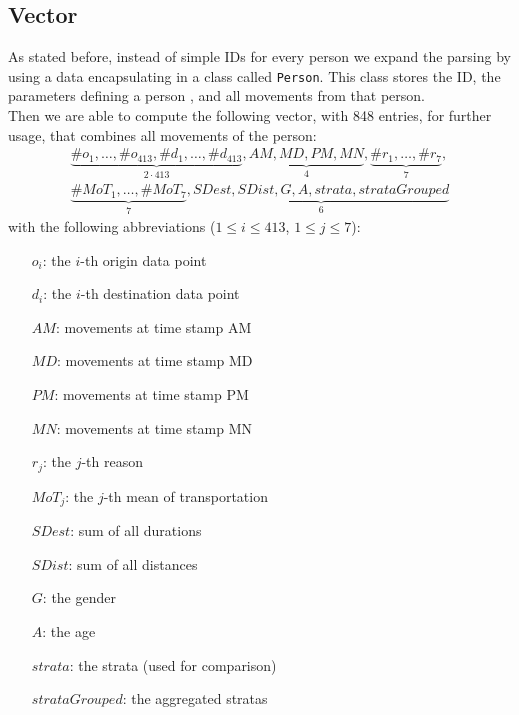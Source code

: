 \documentclass[runningheads]{llncs}
\begin{document}
	\subsection{Vector}\label{subsec: person vector data}
	As stated before, instead of simple IDs for every person we expand the parsing by using a data encapsulating in a class called \texttt{Person}. This class stores the ID, the parameters defining a person %
	, and all movements from that person.\\
	Then we are able to compute the following vector, with 848 entries, for further usage, that combines all movements of the person:
	\begin{align*}
	\underbrace{\#o_1, \dots, \#o_{413}, \#d_1, \dots, \#d_{413}}_{2\cdot 413} ,
	\underbrace{\mathit{AM}, \mathit{MD}, \mathit{PM}, \mathit{MN}}_{4}, 
	\underbrace{\#r_1, \dots, \#r_7}_{7}, \\
	\underbrace{\#\mathit{MoT}_1, \dots, \#\mathit{MoT}_7}_{7}, \underbrace{\mathit{SDest}, \mathit{SDist}, \mathit{G}, \mathit{A} ,\mathit{strata}, \mathit{strataGrouped}}_{6}
	\end{align*}
	with the following abbreviations ($1 \le i \le 413$, $1 \le j \le 7$):
	\begin{multicols}{2}
		\begin{itemize}
			\setlength{\itemindent}{.4cm}
			\item[$o_i$:]  the $i$-th origin data point
			\item[$d_i$:]  the $i$-th destination data point
			\item[$\mathit{AM}$:] movements at time stamp AM
			\item[$\mathit{MD}$:] movements at time stamp MD
			\item[$\mathit{PM}$:] movements at time stamp PM
			\item[$\mathit{MN}$:] movements at time stamp MN
			\item[$r_j$:] the $j$-th reason
			\item[$\mathit{MoT}_j$:] the $j$-th mean of transportation
			\item[$\mathit{SDest}$:] sum of all durations
			\item[$\mathit{SDist}$:] sum of all distances
			\item[$\mathit{G}$:] the gender
			\item[$\mathit{A}$:] the age
			\item[$strata$:] the strata (used for comparison)
			\item[$strataGrouped$:] the aggregated stratas
		\end{itemize}
	\end{multicols}
\end{document}
